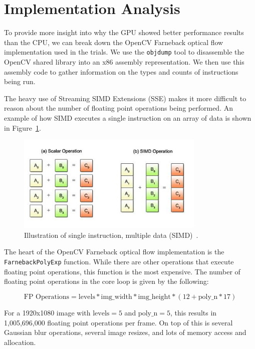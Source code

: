 \documentclass[12pt,letterpaper]{article}
\begin{document}
\section{Implementation Analysis}
To provide more insight into why the GPU showed better performance results than
the CPU, we can break down the OpenCV Farneback optical flow implementation
used in the trials. We use the \texttt{objdump} tool to disassemble the OpenCV
shared library into an x86 assembly representation. We then use this assembly
code to gather information on the types and counts of instructions being run.

The heavy use of Streaming SIMD Extensions (SSE) makes it more difficult to
reason about the number of floating point operations being performed. An
example of how SIMD executes a single instruction on an array of data is shown
in Figure~\ref{fig:simd}.

\begin{figure}[h]
  \centering
    \includegraphics[width=0.8\textwidth]{img/simd.jpg}
  \caption{Illustration of single instruction, multiple data (SIMD)~\cite{simd}.}
  \label{fig:simd}
\end{figure}

The heart of the OpenCV Farneback optical flow implementation is the
\texttt{FarnebackPolyExp} function. While there are other operations that
execute floating point operations, this function is the most expensive. The
number of floating point operations in the core loop is given by the following:

$$
\text{FP Operations} = \text{levels} * \text{img\_width} * \text{img\_height}
                * (12 + \text{poly\_n} * 17)
$$

For a 1920x1080 image with $\text{levels}=5$ and $\text{poly\_n}=5$, this
results in 1,005,696,000 floating point operations per frame. On top of this is
several Gaussian blur operations, several image resizes, and lots of memory
access and allocation.
\end{document}

